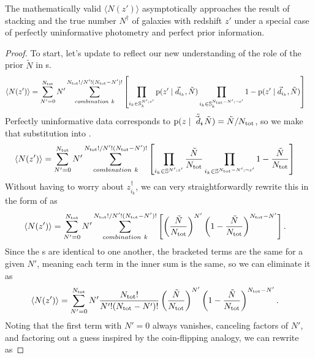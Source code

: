 \begin{theorem}
	\label{thm:uninformative}
	The mathematically valid $\langle N(z') \rangle$ asymptotically approaches the result of stacking and the true number $N^{\dagger}$ of galaxies with redshift $z'$ under a special case of perfectly uninformative photometry and perfect prior information.
\end{theorem}
\begin{proof}
	To start, let's update  to reflect our new understanding of the role of the prior $\tilde{N}$ in \pzpdf s.
	\begin{align}
	\label{eqn:proofwithprior1}
	\langle N(z') \rangle &= \sum_{N' = 0}^{N_{\mathrm{tot}}} N' \sum_{combination\ k}^{N_{\mathrm{tot}}! / N'! (N_{\mathrm{tot}} - N')!} \left[ \prod_{i_{k} \in \mathbb{S}^{N'; z'}_{k}} \mathrm{p}(z' \mid \vec{d}_{i_{k}}, \tilde{N}) \prod_{i_{k} \in \mathbb{S}^{N_{\mathrm{tot}} - N'; \lnot z'}_{k}} 1 - \mathrm{p}(z' \mid \vec{d}_{i_{k}}, \tilde{N}) \right]
	\end{align}
	Perfectly uninformative data corresponds to $\mathrm{p}(z \mid \tilde{\vec{d}_{i}}, \tilde{N}) = \tilde{N} / N_{\mathrm{tot}}$, so we make that substitution into .
	\begin{align}
	\eqlabel{eqn:proofwithprior2}
	\langle N(z') \rangle &= \sum_{N' = 0}^{\ntot} N' \sum_{combination\ k}^{\ntot! / N'! (\ntot - N')!} \left[ \prod_{i_{k} \in \mathbb{S}^{N'; z'}} \frac{\tilde{N}}{\ntot} \prod_{i_{k} \in \mathbb{S}^{\ntot - N'; \lnot z'}} 1 - \frac{\tilde{N}}{\ntot} \right]
	\end{align}
	Without having to worry about $z^{\dagger}_{i_{k}}$, we can very straightforwardly rewrite this in the form of  as
	\begin{align}
	\eqlabel{eqn:proofwithprior3}
	\langle N(z') \rangle &= \sum_{N' = 0}^{\ntot} N' \sum_{combination\ k}^{\ntot! / N'! (\ntot - N')!} \left[ \left(\frac{\tilde{N}}{\ntot}\right)^{N'} \left(1 - \frac{\tilde{N}}{\ntot}\right)^{\ntot - N'} \right] .
	\end{align}
	Since the \pzpdf s are identical to one another, the bracketed terms are the same for a given $N'$, meaning each term in the inner sum is the same, so we can eliminate it as 
	\begin{align}
	\eqlabel{eqn:proofwithprior4}
	\langle N(z') \rangle &= \sum_{N' = 0}^{\ntot} N' \frac{\ntot!}{N'! (\ntot - N')!} \left(\frac{\tilde{N}}{\ntot}\right)^{N'} \left(1 - \frac{\tilde{N}}{\ntot}\right)^{\ntot - N'} .
	\end{align}
	Noting that the first term with $N' = 0$ always vanishes, canceling factors of $N'$, and factoring out a guess inspired by the coin-flipping analogy, we can rewrite  as

\end{proof}
